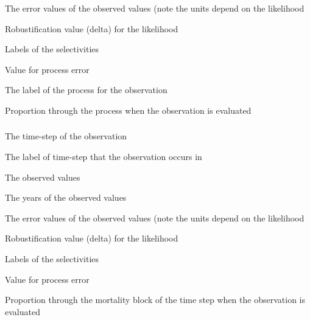  {The error values of the observed values (note the units depend on the likelihood}

 {Robustification value (delta) for the likelihood}

 {Labels of the selectivities}

 {Value for process error}

 {The label of the process for the observation}

 {Proportion through the process when the observation is evaluated}

\subsubsection[Biomass]{}

 {The time-step of the observation}

 {The label of time-step that the observation occurs in}

 {The observed values}

 {The years of the observed values}

 {The error values of the observed values (note the units depend on the likelihood}

 {Robustification value (delta) for the likelihood}

 {Labels of the selectivities}

 {Value for process error}

 {Proportion through the mortality block of the time step when the observation is evaluated}

\subsubsection[Process Removals By Age]{}


